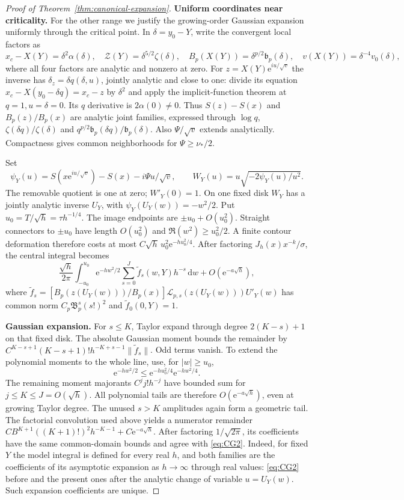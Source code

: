 \begin{proof}[Proof of Theorem~\ref{thm:canonical-expansion}]
\textbf{Uniform coordinates near criticality.} For the other range we justify the growing-order Gaussian expansion
uniformly through the critical point. In $\delta=y_0-Y$, write the
convergent local factors as
\[
 x_c-X(Y)=\delta^2\alpha(\delta),\quad
 \mathcal Z(Y)=\delta^{5/2}\zeta(\delta),\quad
 B_p(X(Y))=\delta^{p/2}\mathfrak b_p(\delta),\quad
 v(X(Y))=\delta^{-4}v_0(\delta),
\]
where all four factors are analytic and nonzero at zero.
For $z=X(Y)\mathrm{e}^{iu/\sqrt v}$ the inverse has
$\delta_z=\delta q(\delta,u)$, jointly analytic and close to one:
divide its equation $x_c-X(y_0-\delta q)=x_c-z$ by $\delta^2$
and apply the implicit-function theorem at $q=1,u=\delta=0$.
Its $q$ derivative is $2\alpha(0)\ne0$.
Thus $S(z)-S(x)$ and $B_p(z)/B_p(x)$ are analytic joint families,
expressed through $\log q$, $\zeta(\delta q)/\zeta(\delta)$ and
$q^{p/2}\mathfrak b_p(\delta q)/\mathfrak b_p(\delta)$.
Also $\Psi/\sqrt v$ extends analytically. Compactness gives common
neighborhoods for $\Psi\ge\nu_*/2$.

Set
\[
 \psi_Y(u)=S(x\mathrm{e}^{iu/\sqrt v})-S(x)-i\Psi u/\sqrt v,
 \qquad W_Y(u)=u\sqrt{-2\psi_Y(u)/u^2}.
\]
The removable quotient is one at zero; $W'_Y(0)=1$.
On one fixed disk $W_Y$ has a jointly analytic inverse $U_Y$,
with $\psi_Y(U_Y(w))=-w^2/2$.
Put $u_0=T/\sqrt h=\tau h^{-1/4}$.
The image endpoints are $\pm u_0+O(u_0^2)$. Straight connectors
to $\pm u_0$ have length $O(u_0^2)$ and
$\Re(w^2)\ge u_0^2/2$. A finite contour deformation therefore
costs at most $C\sqrt h\,u_0^2\mathrm{e}^{-hu_0^2/4}$.
After factoring $J_h(x)x^{-k}/\sigma$, the central integral becomes
\[
 \frac{\sqrt h}{2\pi}\int_{-u_0}^{u_0}\mathrm{e}^{-hw^2/2}
       \sum_{s=0}^J\widetilde f_s(w,Y)h^{-s}\,\mathrm{d}w
       +O(\mathrm{e}^{-a\sqrt h}),
\]
where
$\widetilde f_s=[B_p(z(U_Y(w)))/B_p(x)]
 \mathcal L_{p,s}(z(U_Y(w)))U'_Y(w)$ has common norm
$C_p\mathfrak B_p^s(s!)^2$ and $\widetilde f_0(0,Y)=1$.

\textbf{Gaussian expansion.} For $s\le K$, Taylor expand through degree $2(K-s)+1$ on that
fixed disk. The absolute Gaussian moment bounds the remainder by
$C^{K-s+1}(K-s+1)!h^{-K+s-1}\|\widetilde f_s\|$.
Odd terms vanish. To extend the polynomial moments to the whole line,
use, for $|w|\ge u_0$,
\[
 \mathrm{e}^{-hw^2/2}\le \mathrm{e}^{-hu_0^2/4}\mathrm{e}^{-hw^2/4}.
\]
The remaining moment majorants $C^j j!h^{-j}$ have bounded sum
for $j\le K\le J=O(\sqrt h)$. All polynomial tails are therefore
$O(\mathrm{e}^{-a\sqrt h})$, even at growing Taylor degree.
The unused $s>K$ amplitudes again form a geometric tail.
The factorial convolution used above yields a numerator remainder
$CB^{K+1}((K+1)!)^2h^{-K-1}+C\mathrm{e}^{-a\sqrt h}$.
After factoring $1/\sqrt{2\pi}$, its coefficients have the same
common-domain bounds and agree with \eqref{eq:CG2}. Indeed, for fixed
$Y$ the model integral is defined for every real $h$, and both
families are the coefficients of its asymptotic expansion as
$h\to\infty$ through real values: \eqref{eq:CG2} before and the present
ones after the analytic change of variable $u=U_Y(w)$. Such expansion
coefficients are unique.


\end{proof}
